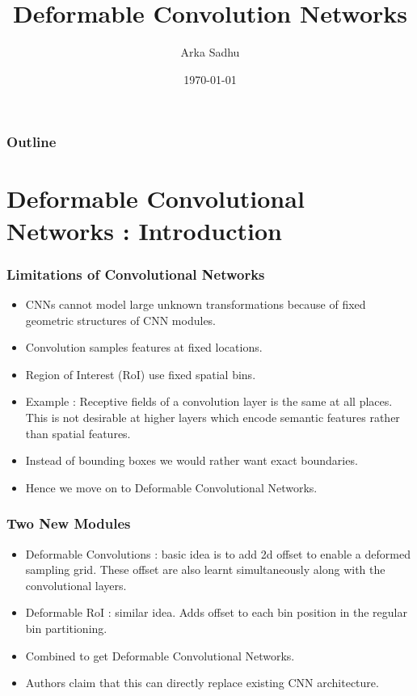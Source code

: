 \documentclass{beamer}
\title{Deformable Convolution Networks}
\author{Arka Sadhu}
\institute{IIT Bombay}
\date{\today}
\begin{document}


\begin{frame}
\titlepage
\end{frame}

\begin{frame}
\frametitle{Outline}
\tableofcontents
\end{frame}

\section{Deformable Convolutional Networks : Introduction}

\begin{frame}
  \frametitle{Limitations of Convolutional Networks}

  \begin{itemize}
  \item CNNs cannot model large unknown transformations because of fixed geometric structures of CNN modules.
  \item Convolution samples features at fixed locations.
  \item Region of Interest (RoI) use fixed spatial bins.
  \item Example : Receptive fields of a convolution layer is the same at all places. This is not desirable at higher layers which encode semantic features rather than spatial features.
  \item Instead of bounding boxes we would rather want exact boundaries.
  \item Hence we move on to Deformable Convolutional Networks.
  \end{itemize}
\end{frame}

\begin{frame}
  \frametitle{Two New Modules}
  \begin{itemize}
  \item Deformable Convolutions : basic idea is to add 2d offset to enable a deformed sampling grid. These offset are also learnt simultaneously along with the convolutional layers.
  \item Deformable RoI : similar idea. Adds offset to each bin position in the regular bin partitioning.
  \item Combined to get Deformable Convolutional Networks.
  \item Authors claim that this can directly replace existing CNN architecture.
  \end{itemize}
\end{frame}
\end{document}
